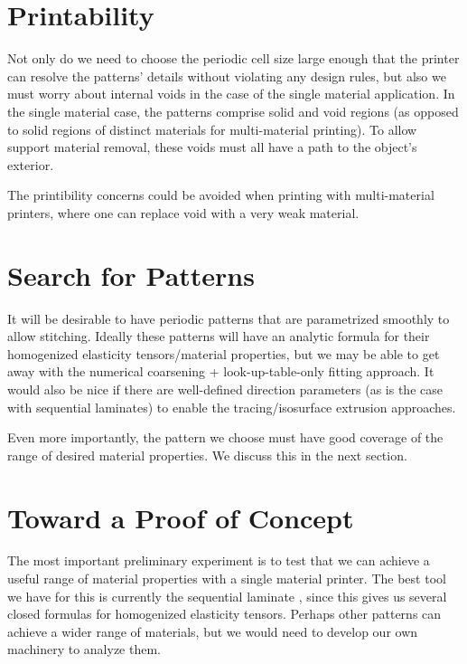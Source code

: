 \documentclass[10pt]{article}
\begin{document}

\section{Printability}
Not only do we need to choose the periodic cell size large enough that the
printer can resolve the patterns' details without violating any design rules,
but also we must worry about internal voids in the case of the single material
application. In the single material case, the patterns comprise solid and void
regions (as opposed to solid regions of distinct materials for multi-material
printing). To allow support material removal, these voids must all have a path
to the object's exterior.

The printibility concerns could be avoided when printing with multi-material
printers, where one can replace void with a very weak material.

\section{Search for Patterns}
It will be desirable to have periodic patterns that are
parametrized smoothly to allow stitching. Ideally these patterns will have
an analytic formula for their homogenized elasticity tensors/material
properties, but we may be able to get away with the numerical coarsening +
look-up-table-only fitting approach. It would also be nice if there are
well-defined direction parameters (as is the case with sequential laminates) to
enable the tracing/isosurface extrusion approaches.

Even more importantly, the pattern we choose must have good coverage of the
range of desired material properties. We discuss this in the next section.

\section{Toward a Proof of Concept}
The most important preliminary experiment is to test that we
can achieve a useful range of material properties with a single material
printer. The best tool we have for this is currently the sequential laminate
\cite{allaire2002shape}, since this gives us several closed formulas for
homogenized elasticity tensors. Perhaps other patterns can achieve a wider range
of materials, but we would need to develop our own machinery to analyze them.
\end{document}
